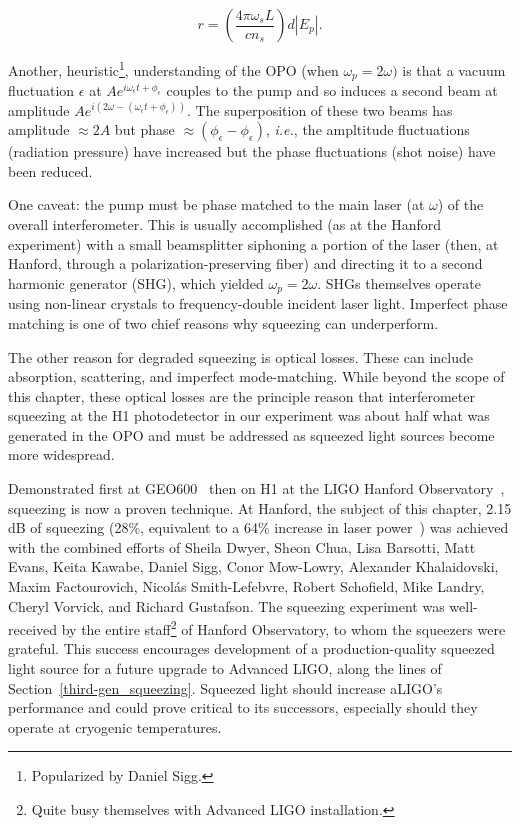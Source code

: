 \begin{equation}
r = \left(\frac{4\pi \omega_s L}{c n_s} \right) d |E_p|.
\label{how_much_squeezing}
\end{equation} 

\noindent Another, heuristic\footnote{Popularized by Daniel Sigg.}, understanding of the OPO (when $\omega_p = 2\omega)$ is that a vacuum fluctuation $\epsilon$ at $A e^{i\omega_\epsilon t + \phi_\epsilon}$ couples to the pump and so induces a second beam at amplitude $A e^{i\left(2\omega - (\omega_\epsilon t + \phi_\epsilon)\right)}$.
The superposition of these two beams has amplitude $\approx 2 A$ but phase $\approx (\phi_\epsilon - \phi_\epsilon)$, \textit{i.e.}, the ampltitude fluctuations (radiation pressure) have increased but the phase fluctuations (shot noise) have been reduced.

One caveat: the pump must be phase matched to the main laser (at $\omega$) of the overall interferometer.
This is usually accomplished (as at the Hanford experiment) with a small beamsplitter siphoning a portion of the laser (then, at Hanford, through a polarization-preserving fiber) and directing it to a second harmonic generator (SHG), which yielded $\omega_p = 2\omega$.
SHGs themselves operate using non-linear crystals to frequency-double incident laser light.
Imperfect phase matching is one of two chief reasons why squeezing can underperform.

The other reason for degraded squeezing is optical losses.
These can include absorption, scattering, and imperfect mode-matching.
While beyond the scope of this chapter, these optical losses are the principle reason that interferometer squeezing at the H1 photodetector in our experiment was about half what was generated in the OPO and must be addressed as squeezed light sources become more widespread.

Demonstrated first at GEO600~\cite{GEO600NatureSqueezing} then on H1 at the LIGO Hanford Observatory~\cite{BarsottiNatureSqueezing}, squeezing is now a proven technique.
At Hanford, the subject of this chapter, 2.15 dB of squeezing (28\%, equivalent to a 64\% increase in laser power~\cite{BarsottiNatureSqueezing}) was achieved with the combined efforts of Sheila Dwyer, Sheon Chua, Lisa Barsotti, Matt Evans, Keita Kawabe, Daniel Sigg, Conor Mow-Lowry, Alexander Khalaidovski, Maxim Factourovich, Nicol\'{a}s Smith-Lefebvre, Robert Schofield, Mike Landry, Cheryl Vorvick, and Richard Gustafson.
The squeezing experiment was well-received by the entire staff\footnote{Quite busy themselves with Advanced LIGO installation.} of Hanford Observatory, to whom the squeezers were grateful.
This success encourages development of a production-quality squeezed light source for a future upgrade to Advanced LIGO, along the lines of Section~\ref{third-gen_squeezing}.
Squeezed light should increase aLIGO's performance and could prove critical to its successors, especially should they operate at cryogenic temperatures.

